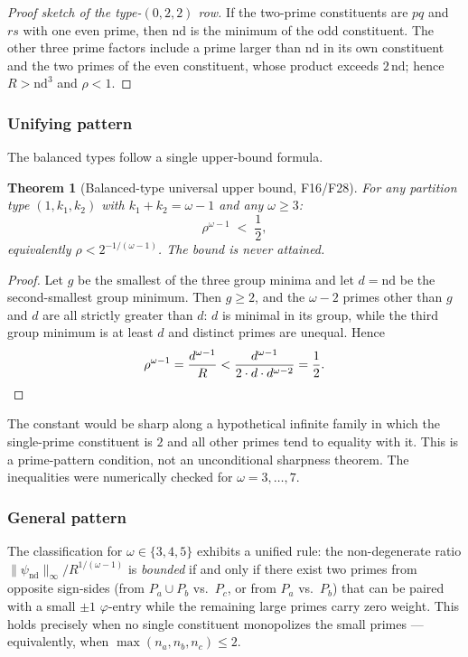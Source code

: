 \documentclass[12pt]{article}
\newtheorem{theorem}{Theorem}
\theoremstyle{definition}
\begin{document}
\begin{proof}[Proof sketch of the type-$(0,2,2)$ row]
If the two-prime constituents are $pq$ and $rs$ with one even prime, then
$\mathrm{nd}$ is the minimum of the odd constituent.  The other three prime
factors include a prime larger than $\mathrm{nd}$ in its own constituent and
the two primes of the even constituent, whose product exceeds $2\,\mathrm{nd}$;
hence $R>\mathrm{nd}^3$ and $\rho<1$.
\end{proof}

\subsubsection*{Unifying pattern}

The balanced types follow a single upper-bound formula.

\begin{theorem}[Balanced-type universal upper bound, F16/F28]\label{thm:pattern}
For any partition type $(1, k_1, k_2)$ with $k_1+k_2=\omega-1$ and any
$\omega \ge 3$:
\[
  \rho^{\omega-1} \;<\; \frac12,
\]
equivalently $\rho<2^{-1/(\omega-1)}$.  The bound is never attained.
\end{theorem}

\begin{proof}
Let $g$ be the smallest of the three group minima and let
$d=\mathrm{nd}$ be the second-smallest group minimum.  Then $g\ge2$, and the
$\omega-2$ primes other than $g$ and $d$ are all strictly greater than $d$:
$d$ is minimal in its group, while the third group minimum is at least $d$ and
distinct primes are unequal.  Hence
\[
  \rho^{\omega-1}
  =\frac{d^{\omega-1}}{R}
  <\frac{d^{\omega-1}}{2\cdot d\cdot d^{\omega-2}}
  =\frac12. \qedhere
\]
\end{proof}

The constant would be sharp along a hypothetical infinite family in which the
single-prime constituent is $2$ and all other primes tend to equality with it.
This is a prime-pattern condition, not an unconditional sharpness theorem.
The inequalities were numerically checked for $\omega=3,\ldots,7$.

\subsubsection*{General pattern}

The classification for $\omega \in \{3,4,5\}$ exhibits a unified rule:
the non-degenerate ratio $\|\psi_{\text{nd}}\|_\infty / R^{1/(\omega-1)}$ is
\emph{bounded} if and only if there exist two primes from opposite sign-sides
(from $P_a \cup P_b$ vs.\ $P_c$, or from $P_a$ vs.\ $P_b$) that can be
paired with a small $\pm 1$ $\varphi$-entry while the remaining large primes carry
zero weight.  This holds precisely when no single constituent monopolizes the
small primes --- equivalently, when $\max(n_a, n_b, n_c) \le 2$.
\end{document}
